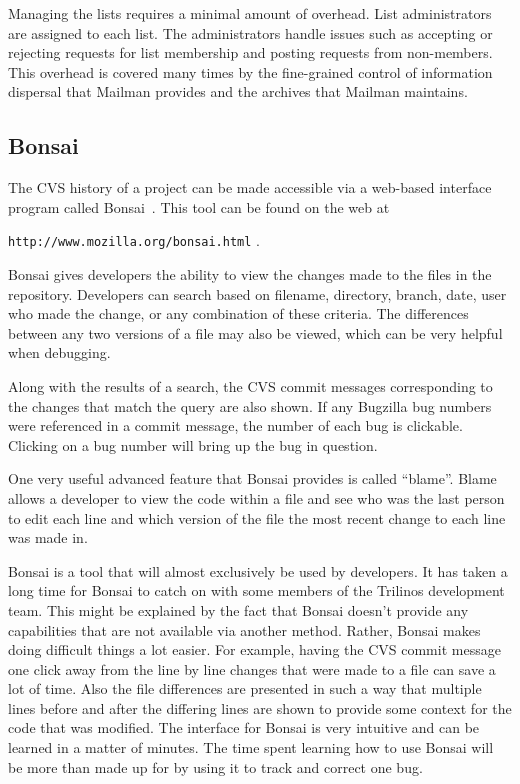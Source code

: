 \documentclass[12pt,relax]{article}
\newcommand{\InlineDirectory}[1]{
  {\hspace{0.01 in}} {\tt #1} {\hspace{0.01 in}}}
\begin{document}
Managing the lists requires a minimal amount of overhead.  List administrators
are assigned to each list.  The administrators handle issues such as accepting
or rejecting requests for list membership and posting requests from 
non-members.  This overhead is covered many times by the fine-grained control
of information dispersal that Mailman provides and the archives that 
Mailman maintains.

\subsection{Bonsai}
\label{subsect:Bonsai}

The CVS history of a project can be made accessible via a
web-based interface program called Bonsai~\cite{Bonsai}.  This tool can be 
found on the web at 
\newline
\InlineDirectory{http://www.mozilla.org/bonsai.html}.  

Bonsai gives developers the ability to view the changes made to the files in 
the repository. Developers can search 
based on filename, directory, branch, date, user who made the 
change, or any combination of these criteria.  The differences between any two 
versions of a file may also be viewed, which can be very helpful when 
debugging.  

Along with the results of a search, the CVS commit messages corresponding to 
the changes that match the query are also shown.  If any Bugzilla bug numbers 
were referenced in a commit message, the number of each bug is clickable.  
Clicking on a bug number will bring up the bug in question.

One very useful advanced feature that Bonsai provides is called ``blame''.  
Blame allows a developer to view the code within a file and see who was the 
last person to edit each line and which version of the file 
the most recent change to each line was made in.

Bonsai is a tool that will almost exclusively be used by developers.  It has 
taken a long time for Bonsai to catch on with some members of the Trilinos 
development team.  This might be explained by the fact that Bonsai doesn't 
provide any capabilities that are not available via another method.  
Rather, Bonsai makes doing difficult things a lot easier.
For example, having the CVS commit message one click away from the line 
by line changes that
were made to a file can save a lot of time.  Also the file differences are 
presented in such a way that multiple lines before and after the differing 
lines are shown to provide some context for the code that was modified.  
The interface for Bonsai is very intuitive and can be learned in a matter of 
minutes.  The time spent learning how to use Bonsai will be more than made up 
for by using it to track and correct one bug.
\end{document}
